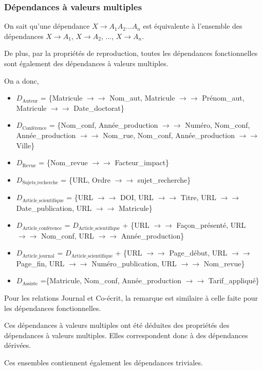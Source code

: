 \documentclass[a4paper, 12pt]{article}
\begin{document}
	\subsubsection{Dépendances à valeurs multiples}
	On sait qu'une dépendance $X\rightarrow A_1A_2...A_n$ est équivalente à l'ensemble des dépendances $X\rightarrow A_1$, $X\rightarrow A_2$, ..., $X\rightarrow A_n$.\par
	De plus, par la propriétés de reproduction, toutes les dépendances fonctionnelles sont également des dépendances à valeurs multiples.\par
	On a donc,
	\begin{itemize}
		\item $D_{\text{Auteur}}$ = \{Matricule $\rightarrow\rightarrow$ Nom\_aut, Matricule $\rightarrow\rightarrow$ Prénom\_aut, Matricule $\rightarrow\rightarrow$ Date\_doctorat\}
		\item $D_{\text{Conférence}}$ = \{Nom\_conf, Année\_production  $\rightarrow\rightarrow$ Numéro, Nom\_conf, Année\_production  $\rightarrow\rightarrow$ Nom\_rue, Nom\_conf, Année\_production  $\rightarrow\rightarrow$ Ville\}
		\item $D_{\text{Revue}}$ = \{Nom\_revue $\rightarrow\rightarrow$ Facteur\_impact\}
		\item $D_{\text{Sujets\_recherche}}$ = \{URL, Ordre $\rightarrow\rightarrow$ sujet\_recherche\}
		\item $D_{\text{Article\_scientifique}}$ = \{URL $\rightarrow\rightarrow$ DOI, URL $\rightarrow\rightarrow$ Titre, URL $\rightarrow\rightarrow$ Date\_publication, URL $\rightarrow\rightarrow$ Matricule\}
		\item $D_{\text{Article\_conférence}}$ = $D_{\text{Article\_scientifique}}$ + \{URL $\rightarrow\rightarrow$ Façon\_présenté, URL $\rightarrow\rightarrow$ Nom\_conf, URL $\rightarrow\rightarrow$ Année\_production\}
		\item $D_{\text{Article\_journal}}$ = $D_{\text{Article\_scientifique}}$ + \{URL $\rightarrow\rightarrow$ Page\_début, URL $\rightarrow\rightarrow$ Page\_fin, URL $\rightarrow\rightarrow$ Numéro\_publication, URL $\rightarrow\rightarrow$ Nom\_revue\}
		\item $D_{\text{Assiste}}$ =\{Matricule, Nom\_conf, Année\_production $\rightarrow\rightarrow$ Tarif\_appliqué\}
	\end{itemize}
	Pour les relations Journal et Co-écrit, la remarque est similaire à celle faite pour les dépendances fonctionnelles.\par
	Ces dépendances à valeurs multiples ont été déduites des propriétés des dépendances à valeurs multiples. Elles correspondent donc à des dépendances dérivées.\par
	Ces ensembles contiennent également les dépendances triviales.
\end{document}
